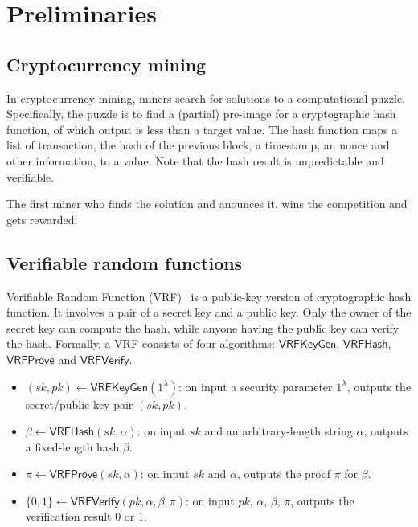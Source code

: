 \section{Preliminaries}

\subsection{Cryptocurrency mining}

In cryptocurrency mining, miners search for solutions to a computational puzzle.
Specifically, the puzzle is to find a (partial) pre-image for a cryptographic hash function, of which output is less than a target value.
The hash function maps a list of transaction, the hash of the previous block, a timestamp, an nonce and other information, to a value.
Note that the hash result is unpredictable and verifiable.


The first miner who finds the solution and anounces it, wins the competition and gets rewarded.


\subsection{Verifiable random functions}

Verifiable Random Function (VRF)~\cite{micali1999verifiable} is a public-key version of cryptographic hash function.
It involves a pair of a secret key and a public key.
Only the owner of the secret key can compute the hash, while anyone having the public key can verify the hash.
Formally, a VRF consists of four algorithms: $\mathsf{VRFKeyGen}$, $\mathsf{VRFHash}$, $\mathsf{VRFProve}$ and $\mathsf{VRFVerify}$.

\begin{itemize}
    \item $(sk, pk) \gets \mathsf{VRFKeyGen}(1^{\lambda})$: on input a security parameter $1^{\lambda}$, outputs the secret/public key pair $(sk, pk)$.
    \item $\beta \gets \mathsf{VRFHash}(sk, \alpha)$: on input $sk$ and an arbitrary-length string $\alpha$, outputs a fixed-length hash $\beta$.
    \item $\pi \gets \mathsf{VRFProve}(sk, \alpha)$: on input $sk$ and $\alpha$, outputs the proof $\pi$ for $\beta$.
    \item $\{0, 1\} \gets \mathsf{VRFVerify}(pk, \alpha, \beta, \pi)$: on input $pk$, $\alpha$, $\beta$, $\pi$, outputs the verification result 0 or 1.
\end{itemize}


